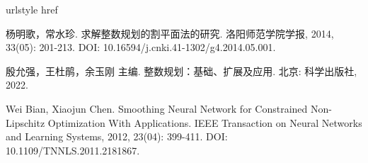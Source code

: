 \documentclass[
	StudentName     = 杨晓宇,
	StudentID       = 1922105012,
	AdvisorName     = 王俊,
	Major           = 信息与计算科学,
	Department      = 理学院,
	SubmitYear		= 2023,
	SubmitMonth		= 6,
	Title           = 加速割平面法的技巧探究,
	TitleEng        = {{Accelerate the exploration of the techniques of the cut plane method}}
]{just_thesis}
\begin{document}
	
	
	
	

%	

{\centering 
{}%
\begin{thebibliography}{2}
\providecommand{\natexlab}[1]{#1}
\providecommand{\url}[1]{#1}
\expandafter\ifx\csname urlstyle\endcsname\relax\else
  \fi
\expandafter\ifx\csname href\endcsname\relax
  \DeclareUrlCommand{}
  \def\eprint#1#2{#2}
\else
  \def\doi#1{\href{https://doi.org/#1}{\nolinkurl{#1}}}
  \let\eprint\href
\fi

杨明歌，常水珍.
\newblock 求解整数规划的割平面法的研究\allowbreak[J].
\newblock 洛阳师范学院学报, 2014, 33\allowbreak (05): 201-213.
\newblock DOI:  \url{10.16594/j.cnki.41-1302/g4.2014.05.001}.

殷允强，王杜鹃，余玉刚 主编.
\newblock 整数规划：基础、扩展及应用\allowbreak[M].
\newblock 北京: 科学出版社, 2022.

Wei Bian, Xiaojun Chen.
\newblock Smoothing Neural Network for Constrained Non-Lipschitz Optimization With Applications\allowbreak[J].
\newblock IEEE Transaction on Neural Networks and Learning Systems, 2012, 23\allowbreak (04): 399-411.
\newblock DOI:  \url{ 10.1109/TNNLS.2011.2181867}.


\end{thebibliography}}
 
\thispagestyle{plain}
	
	

	
\end{document}
